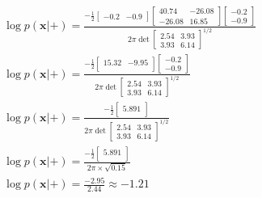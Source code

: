 \documentclass[leqno]{article}
\begin{document}
\begin{gather*}
\begin{split}
&\log p(\textbf{x}|+) = 
\frac{-\frac{1}{2}\begin{bmatrix}
   -0.2 & -0.9 
\end{bmatrix}\begin{bmatrix}
   40.74 & -26.08\\
   -26.08 & 16.85 
\end{bmatrix}\begin{bmatrix}
   -0.2\\
   -0.9 
\end{bmatrix}}{2\pi\det{\begin{bmatrix}
   2.54 & 3.93\\
   3.93 & 6.14 
\end{bmatrix}}^{1/2}}\\
&\log p(\textbf{x}|+) = 
\frac{-\frac{1}{2}\begin{bmatrix}
   15.32 & -9.95\\ 
\end{bmatrix}\begin{bmatrix}
   -0.2\\
   -0.9 
\end{bmatrix}}{2\pi\det{\begin{bmatrix}
   2.54 & 3.93\\
   3.93 & 6.14 
\end{bmatrix}}^{1/2}}\\
&\log p(\textbf{x}|+) = 
\frac{-\frac{1}{2}\begin{bmatrix}
   5.891\\ 
\end{bmatrix}}{2\pi\det{\begin{bmatrix}
   2.54 & 3.93\\
   3.93 & 6.14 
\end{bmatrix}}^{1/2}}\\
&\log p(\textbf{x}|+) = 
\frac{-\frac{1}{2}\begin{bmatrix}
   5.891\\ 
\end{bmatrix}}{2\pi \times \sqrt{0.15}}\\
&\log p(\textbf{x}|+) = 
\frac{-2.95}{2.44}  \approx -1.21
\end{split}
\end{gather*}
\end{document}
